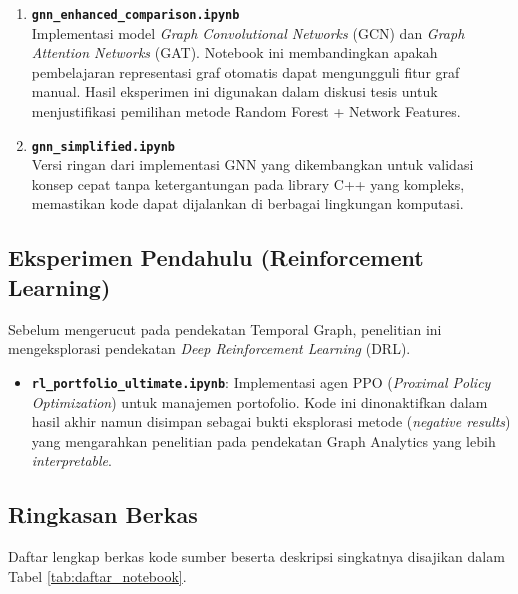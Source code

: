 \begin{enumerate}
    \item \textbf{\texttt{gnn\_enhanced\_comparison.ipynb}} \\
    Implementasi model \textit{Graph Convolutional Networks} (GCN) dan \textit{Graph Attention Networks} (GAT). Notebook ini membandingkan apakah pembelajaran representasi graf otomatis dapat mengungguli fitur graf manual. Hasil eksperimen ini digunakan dalam diskusi tesis untuk menjustifikasi pemilihan metode Random Forest + Network Features.
    
    \item \textbf{\texttt{gnn\_simplified.ipynb}} \\
    Versi ringan dari implementasi GNN yang dikembangkan untuk validasi konsep cepat tanpa ketergantungan pada library C++ yang kompleks, memastikan kode dapat dijalankan di berbagai lingkungan komputasi.
\end{enumerate}

\subsection{Eksperimen Pendahulu (Reinforcement Learning)}
Sebelum mengerucut pada pendekatan Temporal Graph, penelitian ini mengeksplorasi pendekatan \textit{Deep Reinforcement Learning} (DRL).

\begin{itemize}
    \item \textbf{\texttt{rl\_portfolio\_ultimate.ipynb}}: Implementasi agen PPO (\textit{Proximal Policy Optimization}) untuk manajemen portofolio. Kode ini dinonaktifkan dalam hasil akhir namun disimpan sebagai bukti eksplorasi metode (\textit{negative results}) yang mengarahkan penelitian pada pendekatan Graph Analytics yang lebih \textit{interpretable}.
\end{itemize}

\subsection{Ringkasan Berkas}
Daftar lengkap berkas kode sumber beserta deskripsi singkatnya disajikan dalam Tabel \ref{tab:daftar_notebook}.

